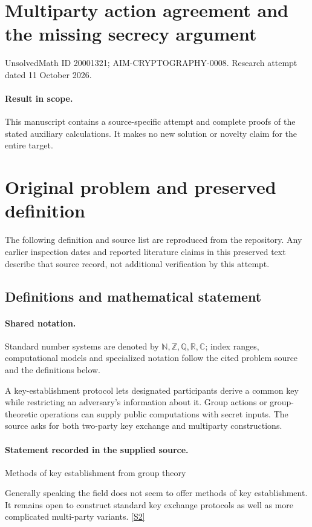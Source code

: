 \documentclass[11pt]{article}
\begin{document}
\section*{Multiparty action agreement and the missing secrecy argument}
\noindent UnsolvedMath ID 20001321; AIM-CRYPTOGRAPHY-0008. Research attempt dated 11 October 2026.
\paragraph{Result in scope.}This manuscript contains a source-specific attempt and complete proofs of the stated auxiliary calculations. It makes no new solution or novelty claim for the entire target.
\section{Original problem and preserved definition}
The following definition and source list are reproduced from the repository. Any earlier inspection dates and reported literature claims in this preserved text describe that source record, not additional verification by this attempt.
\subsection{Definitions and mathematical statement}

\paragraph{Shared notation.}Standard number systems are denoted by $\mathbb N,\mathbb Z,\mathbb Q,\mathbb R,\mathbb C$; index ranges, computational models and specialized notation follow the cited problem source and the definitions below.


A key-establishment protocol lets designated participants derive a common key while restricting an adversary's information about it. Group actions or group-theoretic operations can supply public computations with secret inputs. The source asks for both two-party key exchange and multiparty constructions.
\paragraph{Statement recorded in the supplied source.}
Methods of key establishment from group theory

Generally speaking the field does not seem to offer methods of key establishment. It remains open to construct standard key exchange protocols as well as more complicated multi-party variants. \href{http://aimpl.org/postquantgroup/2/}{[S2]}
\end{document}
